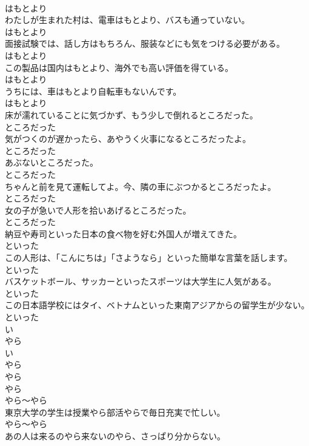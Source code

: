 \documentclass[8pt]{extreport}
\begin{document}
\begin{CJK}{UTF8}{min}
\\	はもとより
\\	わたしが生まれた村は、電車はもとより、バスも通っていない。	
\\	はもとより
\\	面接試験では、話し方はもちろん、服装などにも気をつける必要がある。	
\\	はもとより
\\	この製品は国内はもとより、海外でも高い評価を得ている。	
\\	はもとより
\\	うちには、車はもとより自転車もないんです。	
\\	はもとより
\\	床が濡れていることに気づかず、もう少しで倒れるところだった。	
\\	ところだった
\\	気がつくのが遅かったら、あやうく火事になるところだったよ。	
\\	ところだった
\\	あぶないところだった。	
\\	ところだった
\\	ちゃんと前を見て運転してよ。今、隣の車にぶつかるところだったよ。	
\\	ところだった
\\	女の子が急いで人形を拾いあげるところだった。	
\\	ところだった
\\	納豆や寿司といった日本の食べ物を好む外国人が増えてきた。	
\\	といった
\\	この人形は、「こんにちは」「さようなら」といった簡単な言葉を話します。	
\\	といった
\\	バスケットボール、サッカーといったスポーツは大学生に人気がある。	
\\	といった
\\	この日本語学校にはタイ、ベトナムといった東南アジアからの留学生が少ない。	
\\	といった
\\	い
\\	やら 
\\	い
\\	やら 
\\	やら	
\\	やら 
\\	やら～やら
\\	東京大学の学生は授業やら部活やらで毎日充実で忙しい。	
\\	やら～やら
\\	あの人は来るのやら来ないのやら、さっぱり分からない。	

\end{CJK}
\end{document}
